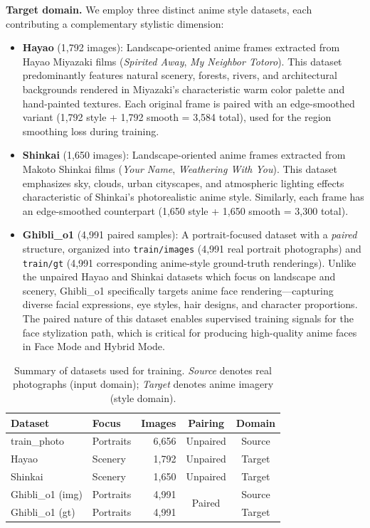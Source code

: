\documentclass[journal]{IEEEtran}
\begin{document}
\textbf{Target domain.} We employ three distinct anime style datasets, each contributing a complementary stylistic dimension:
\begin{itemize}
    \item \textbf{Hayao} (1,792 images): Landscape-oriented anime frames extracted from Hayao Miyazaki films (\textit{Spirited Away}, \textit{My Neighbor Totoro}). This dataset predominantly features natural scenery, forests, rivers, and architectural backgrounds rendered in Miyazaki's characteristic warm color palette and hand-painted textures. Each original frame is paired with an edge-smoothed variant (1,792 style + 1,792 smooth = 3,584 total), used for the region smoothing loss during training.
    \item \textbf{Shinkai} (1,650 images): Landscape-oriented anime frames extracted from Makoto Shinkai films (\textit{Your Name}, \textit{Weathering With You}). This dataset emphasizes sky, clouds, urban cityscapes, and atmospheric lighting effects characteristic of Shinkai's photorealistic anime style. Similarly, each frame has an edge-smoothed counterpart (1,650 style + 1,650 smooth = 3,300 total).
    \item \textbf{Ghibli\_o1} (4,991 paired samples): A portrait-focused dataset with a \textit{paired} structure, organized into \texttt{train/images} (4,991 real portrait photographs) and \texttt{train/gt} (4,991 corresponding anime-style ground-truth renderings). Unlike the unpaired Hayao and Shinkai datasets which focus on landscape and scenery, Ghibli\_o1 specifically targets anime face rendering---capturing diverse facial expressions, eye styles, hair designs, and character proportions. The paired nature of this dataset enables supervised training signals for the face stylization path, which is critical for producing high-quality anime faces in Face Mode and Hybrid Mode.
\end{itemize}

\begin{table}[t]
\caption{Summary of datasets used for training. \textit{Source} denotes real photographs (input domain); \textit{Target} denotes anime imagery (style domain).}
\label{tab:datasets}
\centering
\footnotesize
\setlength{\tabcolsep}{4.5pt}
\begin{tabular}{llrcc}
\toprule
\textbf{Dataset} & \textbf{Focus} & \textbf{Images} & \textbf{Pairing} & \textbf{Domain} \\
\midrule
train\_photo & Portraits & 6,656 & Unpaired & Source \\
Hayao & Scenery & 1,792 & Unpaired & Target \\
Shinkai & Scenery & 1,650 & Unpaired & Target \\
\midrule
Ghibli\_o1 (img) & Portraits & 4,991 & \multirow{2}{*}{Paired} & Source \\
Ghibli\_o1 (gt) & Portraits & 4,991 & & Target \\
\bottomrule
\end{tabular}
\end{table}
\end{document}
